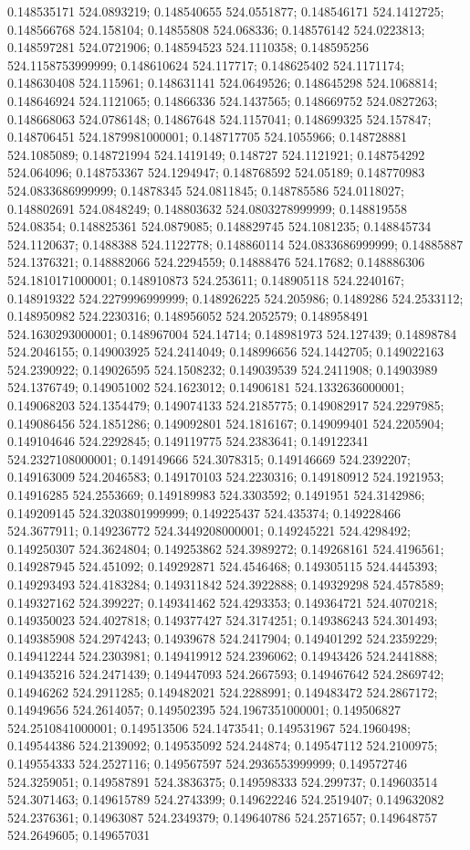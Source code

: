 0.148535171 524.0893219; 0.148540655 524.0551877; 0.148546171 524.1412725; 0.148566768 524.158104; 0.14855808 524.068336; 0.148576142 524.0223813; 0.148597281 524.0721906; 0.148594523 524.1110358; 0.148595256 524.1158753999999; 0.148610624 524.117717; 0.148625402 524.1171174; 0.148630408 524.115961; 0.148631141 524.0649526; 0.148645298 524.1068814; 0.148646924 524.1121065; 0.14866336 524.1437565; 0.148669752 524.0827263; 0.148668063 524.0786148; 0.14867648 524.1157041; 0.148699325 524.157847; 0.148706451 524.1879981000001; 0.148717705 524.1055966; 0.148728881 524.1085089; 0.148721994 524.1419149; 0.148727 524.1121921; 0.148754292 524.064096; 0.148753367 524.1294947; 0.148768592 524.05189; 0.148770983 524.0833686999999; 0.14878345 524.0811845; 0.148785586 524.0118027; 0.148802691 524.0848249; 0.148803632 524.0803278999999; 0.148819558 524.08354; 0.148825361 524.0879085; 0.148829745 524.1081235; 0.148845734 524.1120637; 0.1488388 524.1122778; 0.148860114 524.0833686999999; 0.14885887 524.1376321; 0.148882066 524.2294559; 0.14888476 524.17682; 0.148886306 524.1810171000001; 0.148910873 524.253611; 0.148905118 524.2240167; 0.148919322 524.2279996999999; 0.148926225 524.205986; 0.1489286 524.2533112; 0.148950982 524.2230316; 0.148956052 524.2052579; 0.148958491 524.1630293000001; 0.148967004 524.14714; 0.148981973 524.127439; 0.14898784 524.2046155; 0.149003925 524.2414049; 0.148996656 524.1442705; 0.149022163 524.2390922; 0.149026595 524.1508232; 0.149039539 524.2411908; 0.14903989 524.1376749; 0.149051002 524.1623012; 0.14906181 524.1332636000001; 0.149068203 524.1354479; 0.149074133 524.2185775; 0.149082917 524.2297985; 0.149086456 524.1851286; 0.149092801 524.1816167; 0.149099401 524.2205904; 0.149104646 524.2292845; 0.149119775 524.2383641; 0.149122341 524.2327108000001; 0.149149666 524.3078315; 0.149146669 524.2392207; 0.149163009 524.2046583; 0.149170103 524.2230316; 0.149180912 524.1921953; 0.14916285 524.2553669; 0.149189983 524.3303592; 0.1491951 524.3142986; 0.149209145 524.3203801999999; 0.149225437 524.435374; 0.149228466 524.3677911; 0.149236772 524.3449208000001; 0.149245221 524.4298492; 0.149250307 524.3624804; 0.149253862 524.3989272; 0.149268161 524.4196561; 0.149287945 524.451092; 0.149292871 524.4546468; 0.149305115 524.4445393; 0.149293493 524.4183284; 0.149311842 524.3922888; 0.149329298 524.4578589; 0.149327162 524.399227; 0.149341462 524.4293353; 0.149364721 524.4070218; 0.149350023 524.4027818; 0.149377427 524.3174251; 0.149386243 524.301493; 0.149385908 524.2974243; 0.14939678 524.2417904; 0.149401292 524.2359229; 0.149412244 524.2303981; 0.149419912 524.2396062; 0.14943426 524.2441888; 0.149435216 524.2471439; 0.149447093 524.2667593; 0.149467642 524.2869742; 0.14946262 524.2911285; 0.149482021 524.2288991; 0.149483472 524.2867172; 0.14949656 524.2614057; 0.149502395 524.1967351000001; 0.149506827 524.2510841000001; 0.149513506 524.1473541; 0.149531967 524.1960498; 0.149544386 524.2139092; 0.149535092 524.244874; 0.149547112 524.2100975; 0.149554333 524.2527116; 0.149567597 524.2936553999999; 0.149572746 524.3259051; 0.149587891 524.3836375; 0.149598333 524.299737; 0.149603514 524.3071463; 0.149615789 524.2743399; 0.149622246 524.2519407; 0.149632082 524.2376361; 0.14963087 524.2349379; 0.149640786 524.2571657; 0.149648757 524.2649605; 0.149657031 